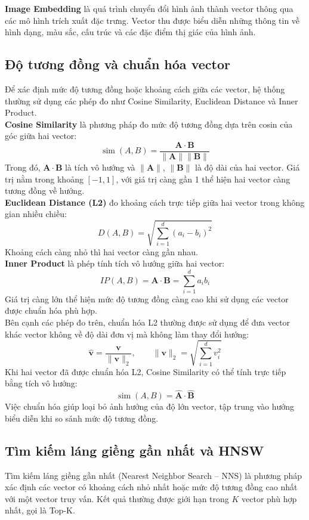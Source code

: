\documentclass{report}
\begin{document}
\textbf{Image Embedding} là quá trình chuyển đổi hình ảnh thành vector thông qua các mô hình trích xuất đặc trưng. Vector thu được biểu diễn những thông tin về hình dạng, màu sắc, cấu trúc và các đặc điểm thị giác của hình ảnh.

\subsection{Độ tương đồng và chuẩn hóa vector}
Để xác định mức độ tương đồng hoặc khoảng cách giữa các vector, hệ thống thường sử dụng các phép đo như Cosine Similarity, Euclidean Distance và Inner Product.\\

\textbf{Cosine Similarity} là phương pháp đo mức độ tương đồng dựa trên cosin của góc giữa hai vector:
\[
\operatorname{sim}(A,B)=
\frac{\mathbf{A}\cdot\mathbf{B}}
{\|\mathbf{A}\|\|\mathbf{B}\|}
\]
Trong đó, $\mathbf{A}\cdot\mathbf{B}$ là tích vô hướng và $\|\mathbf{A}\|$, $\|\mathbf{B}\|$ là độ dài của hai vector. Giá trị nằm trong khoảng $[-1,1]$, với giá trị càng gần 1 thể hiện hai vector càng tương đồng về hướng.\\

\textbf{Euclidean Distance (L2)} đo khoảng cách trực tiếp giữa hai vector trong không gian nhiều chiều:
\[
D(A,B)=
\sqrt{\sum_{i=1}^{d}(a_i-b_i)^2}
\]
Khoảng cách càng nhỏ thì hai vector càng gần nhau.\\

\textbf{Inner Product} là phép tính tích vô hướng giữa hai vector:
\[
IP(A,B)=\mathbf{A}\cdot\mathbf{B}
=\sum_{i=1}^{d}a_i b_i
\]
Giá trị càng lớn thể hiện mức độ tương đồng càng cao khi sử dụng các vector được chuẩn hóa phù hợp.\\

Bên cạnh các phép đo trên, chuẩn hóa L2 thường được sử dụng để đưa vector khác vector không về độ dài đơn vị mà không làm thay đổi hướng:
\[
\hat{\mathbf{v}}=
\frac{\mathbf{v}}{\|\mathbf{v}\|_2},
\qquad
\|\mathbf{v}\|_2=
\sqrt{\sum_{i=1}^{d}v_i^2}
\]
Khi hai vector đã được chuẩn hóa L2, Cosine Similarity có thể tính trực tiếp bằng tích vô hướng:
\[
\operatorname{sim}(A,B)=
\hat{\mathbf{A}}\cdot\hat{\mathbf{B}}
\]
Việc chuẩn hóa giúp loại bỏ ảnh hưởng của độ lớn vector, tập trung vào hướng biểu diễn khi so sánh mức độ tương đồng.

\subsection{Tìm kiếm láng giềng gần nhất và HNSW}
Tìm kiếm láng giềng gần nhất (Nearest Neighbor Search -- NNS) là phương pháp xác định các vector có khoảng cách nhỏ nhất hoặc mức độ tương đồng cao nhất với một vector truy vấn. Kết quả thường được giới hạn trong $K$ vector phù hợp nhất, gọi là Top-K.\\
\end{document}
